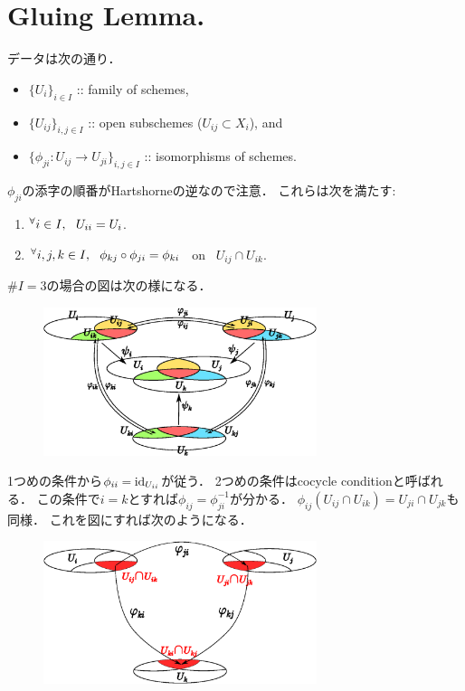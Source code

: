 \documentclass[a4paper]{jsarticle}
\begin{document}
\section{Gluing Lemma.} %
    データは次の通り．
    \begin{itemize}
        \item $\{U_i\}_{i \in I}$ :: family of schemes,
        \item $\{U_{ij}\}_{i,j \in I}$ :: open subschemes ($U_{ij} \subset X_i$), and
        \item $\{\phi_{ji}:U_{ij} \to U_{ji}\}_{i,j \in I}$ :: isomorphisms of schemes.
    \end{itemize}
    $\phi_{ji}$の添字の順番がHartshorneの逆なので注意．
    これらは次を満たす:
    \begin{enumerate}[label=(\arabic*)]
        \item ${}^{\forall} i \in I,~~ U_{ii}=U_i$.
        \item ${}^{\forall} i,j,k \in I,~~ \phi_{kj} \circ \phi_{ji}=\phi_{ki}$ ~on~ $U_{ij} \cap U_{ik}$.
    \end{enumerate}
    $\#I=3$の場合の図は次の様になる．
    \begin{figure}[ht]
    \begin{center}
        \includegraphics[width=8cm]{./images/gluing.eps}
    \end{center}
    \end{figure}

    1つめの条件から$\phi_{ii}=\mathrm{id}_{U_{ii}}$が従う．
    2つめの条件はcocycle conditionと呼ばれる．
    この条件で$i=k$とすれば$\phi_{ij}=\phi_{ji}^{-1}$が分かる．
    $\phi_{ij}(U_{ij} \cap U_{ik})=U_{ji} \cap U_{jk}$も同様．
    これを図にすれば次のようになる．
    \begin{figure}[ht]
    \begin{center}
        \includegraphics[width=8cm]{./images/cocycle_cond.eps}
    \end{center}
    \end{figure}
\end{document}
